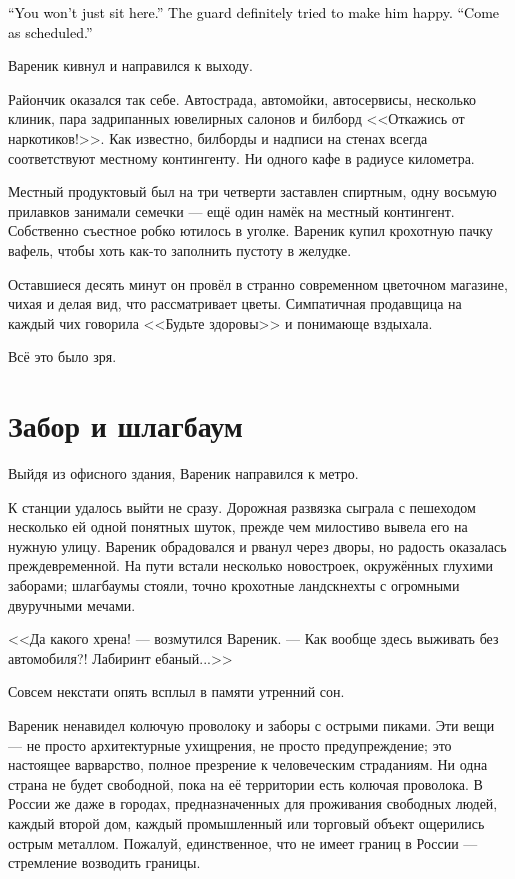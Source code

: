 \documentclass[a4paper,10pt,fleqn]{book}\usepackage{polyglossia}\setdefaultlanguage{english}\setotherlanguage{russian}\defaultfontfeatures{Ligatures=TeX,Mapping=tex-text} \usepackage{xcolor}\definecolor{lightgray}{HTML}{bbbbbb}\color{lightgray}\newcommand{\ml}[3]{\textcolor{black}{#3}}
\begin{document}
\ml{$0$}
{--- Здесь вы не посидите, --- обрадовал его охранник.}
{``You won't just sit here.'' The guard definitely tried to make him happy.}
\ml{$0$}
{--- Приходите ко времени.}
{``Come as scheduled.''}

Вареник кивнул и направился к выходу.

Райончик оказался так себе.
Автострада, автомойки, автосервисы, несколько клиник, пара задрипанных ювелирных салонов и билборд <<Откажись от наркотиков!>>.
Как известно, билборды и надписи на стенах всегда соответствуют местному контингенту.
Ни одного кафе в радиусе километра.

Местный продуктовый был на три четверти заставлен спиртным, одну восьмую прилавков занимали семечки --- ещё один намёк на местный контингент.
Собственно съестное робко ютилось в уголке.
Вареник купил крохотную пачку вафель, чтобы хоть как-то заполнить пустоту в желудке.

Оставшиеся десять минут он провёл в странно современном цветочном магазине, чихая и делая вид, что рассматривает цветы.
Симпатичная продавщица на каждый чих говорила <<Будьте здоровы>> и понимающе вздыхала.

Всё это было зря.

\section{Забор и шлагбаум}

Выйдя из офисного здания, Вареник направился к метро.

К станции удалось выйти не сразу.
Дорожная развязка сыграла с пешеходом несколько ей одной понятных шуток, прежде чем милостиво вывела его на нужную улицу.
Вареник обрадовался и рванул через дворы, но радость оказалась преждевременной.
На пути встали несколько новостроек, окружённых глухими заборами;
шлагбаумы стояли, точно крохотные ландскнехты с огромными двуручными мечами.

<<Да какого хрена! --- возмутился Вареник.
--- Как вообще здесь выживать без автомобиля?!
Лабиринт ебаный...>>

Совсем некстати опять всплыл в памяти утренний сон.

Вареник ненавидел колючую проволоку и заборы с острыми пиками.
Эти вещи --- не просто архитектурные ухищрения, не просто предупреждение;
это настоящее варварство, полное презрение к человеческим страданиям.
Ни одна страна не будет свободной, пока на её территории есть колючая проволока.
В России же даже в городах, предназначенных для проживания свободных людей, каждый второй дом, каждый промышленный или торговый объект ощерились острым металлом.
Пожалуй, единственное, что не имеет границ в России --- стремление возводить границы.
\end{document}
